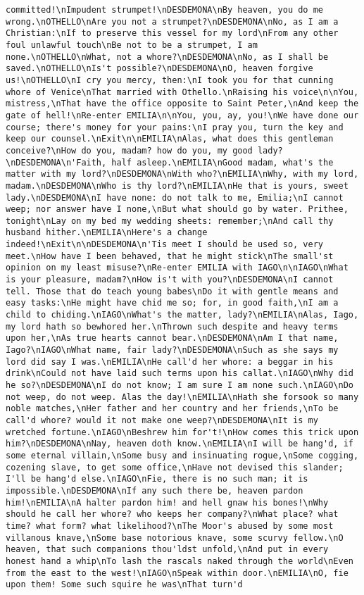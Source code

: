 \begin{verbatim}
committed!\nImpudent strumpet!\nDESDEMONA\nBy heaven, you do me wrong.\nOTHELLO\nAre you not a strumpet?\nDESDEMONA\nNo, as I am a Christian:\nIf to preserve this vessel for my lord\nFrom any other foul unlawful touch\nBe not to be a strumpet, I am none.\nOTHELLO\nWhat, not a whore?\nDESDEMONA\nNo, as I shall be saved.\nOTHELLO\nIs't possible?\nDESDEMONA\nO, heaven forgive us!\nOTHELLO\nI cry you mercy, then:\nI took you for that cunning whore of Venice\nThat married with Othello.\nRaising his voice\n\nYou, mistress,\nThat have the office opposite to Saint Peter,\nAnd keep the gate of hell!\nRe-enter EMILIA\n\nYou, you, ay, you!\nWe have done our course; there's money for your pains:\nI pray you, turn the key and keep our counsel.\nExit\n\nEMILIA\nAlas, what does this gentleman conceive?\nHow do you, madam? how do you, my good lady?\nDESDEMONA\n'Faith, half asleep.\nEMILIA\nGood madam, what's the matter with my lord?\nDESDEMONA\nWith who?\nEMILIA\nWhy, with my lord, madam.\nDESDEMONA\nWho is thy lord?\nEMILIA\nHe that is yours, sweet lady.\nDESDEMONA\nI have none: do not talk to me, Emilia;\nI cannot weep; nor answer have I none,\nBut what should go by water. Prithee, tonight\nLay on my bed my wedding sheets: remember;\nAnd call thy husband hither.\nEMILIA\nHere's a change indeed!\nExit\n\nDESDEMONA\n'Tis meet I should be used so, very meet.\nHow have I been behaved, that he might stick\nThe small'st opinion on my least misuse?\nRe-enter EMILIA with IAGO\n\nIAGO\nWhat is your pleasure, madam?\nHow is't with you?\nDESDEMONA\nI cannot tell. Those that do teach young babes\nDo it with gentle means and easy tasks:\nHe might have chid me so; for, in good faith,\nI am a child to chiding.\nIAGO\nWhat's the matter, lady?\nEMILIA\nAlas, Iago, my lord hath so bewhored her.\nThrown such despite and heavy terms upon her,\nAs true hearts cannot bear.\nDESDEMONA\nAm I that name, Iago?\nIAGO\nWhat name, fair lady?\nDESDEMONA\nSuch as she says my lord did say I was.\nEMILIA\nHe call'd her whore: a beggar in his drink\nCould not have laid such terms upon his callat.\nIAGO\nWhy did he so?\nDESDEMONA\nI do not know; I am sure I am none such.\nIAGO\nDo not weep, do not weep. Alas the day!\nEMILIA\nHath she forsook so many noble matches,\nHer father and her country and her friends,\nTo be call'd whore? would it not make one weep?\nDESDEMONA\nIt is my wretched fortune.\nIAGO\nBeshrew him for't!\nHow comes this trick upon him?\nDESDEMONA\nNay, heaven doth know.\nEMILIA\nI will be hang'd, if some eternal villain,\nSome busy and insinuating rogue,\nSome cogging, cozening slave, to get some office,\nHave not devised this slander; I'll be hang'd else.\nIAGO\nFie, there is no such man; it is impossible.\nDESDEMONA\nIf any such there be, heaven pardon him!\nEMILIA\nA halter pardon him! and hell gnaw his bones!\nWhy should he call her whore? who keeps her company?\nWhat place? what time? what form? what likelihood?\nThe Moor's abused by some most villanous knave,\nSome base notorious knave, some scurvy fellow.\nO heaven, that such companions thou'ldst unfold,\nAnd put in every honest hand a whip\nTo lash the rascals naked through the world\nEven from the east to the west!\nIAGO\nSpeak within door.\nEMILIA\nO, fie upon them! Some such squire he was\nThat turn'd 
\end{verbatim}

